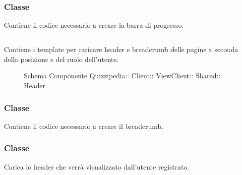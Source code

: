 \subsubsection{Classe }
Contiene il codice necessario a creare la barra di progresso.
\begin{itemize}
\end{itemize}
\subsection{}
Contiene i template per caricare header e breadcrumb delle pagine a seconda della posizione e del ruolo dell'utente.
\begin{figure}[H]
\centering
\noindent{}
\caption[Schema Componente Header]{Schema Componente Quizzipedia:: Client:: ViewClient:: Shared:: Header}
\end{figure}
\subsubsection{Classe }
Contiene il codice necessario a creare il breadcrumb.
\begin{itemize}
\end{itemize}
\subsubsection{Classe }
Carica lo header che verrà visualizzato dall'utente registrato.
\begin{itemize}
\end{itemize}
